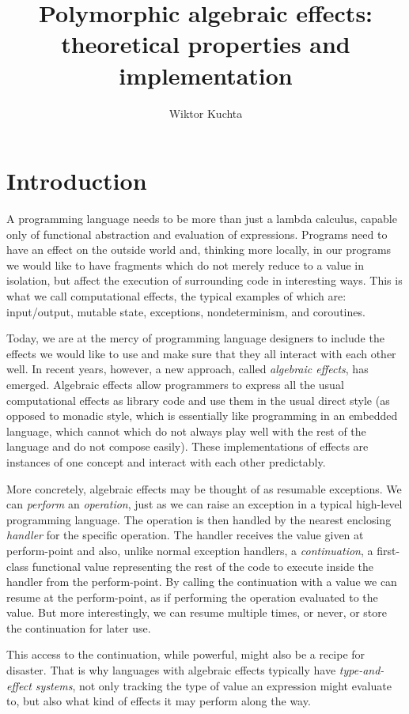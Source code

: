 \documentclass[a4paper, 12pt]{report}
\title{Polymorphic algebraic effects: theoretical properties and implementation}
\author{Wiktor Kuchta}
\date{\vspace{-4ex}}
\newcommand{\+}{\enspace}
\begin{document}
\maketitle

\chapter{Introduction}
A programming language needs to be more than just a lambda calculus,
capable only of functional abstraction and evaluation of expressions.
Programs need to have an effect on the outside world and, thinking more locally,
in our programs we would like to have fragments which do not merely reduce to a value in isolation,
but affect the execution of surrounding code in interesting ways.
This is what we call computational effects, the typical examples of which are:
input/output, mutable state, exceptions, nondeterminism, and coroutines.

Today, we are at the mercy of programming language designers to include the
effects we would like to use and make sure that they all interact with
each other well.
In recent years, however, a new approach, called \textit{algebraic effects}, has emerged.
Algebraic effects allow programmers to express all the usual computational effects as library code
and use them in the usual direct style (as opposed to monadic style, %
which is essentially like programming in an embedded language, which cannot 
which do not always play well with the rest of the language and do not compose easily).
These implementations of effects are instances of one concept and interact
with each other predictably.

More concretely, algebraic effects may be thought of as resumable exceptions.
We can \textit{perform} an \textit{operation},
just as we can raise an exception in a typical high-level programming language.
The operation is then handled by the nearest enclosing \textit{handler} for the specific operation.
The handler receives the value given at perform-point and also,
unlike normal exception handlers,
a \textit{continuation}, a first-class functional value representing the rest
of the code to execute inside the handler from the perform-point.
By calling the continuation with a value we can resume at the perform-point,
as if performing the operation evaluated to the value.
But more interestingly, we can resume multiple times, or never, or store the continuation for later use.

This access to the continuation, while powerful, might also be a recipe for disaster. %
That is why languages with algebraic effects typically have
\textit{type-and-effect systems},
not only tracking the type of value an expression might evaluate to, but also
what kind of effects it may perform along the way.
\end{document}
